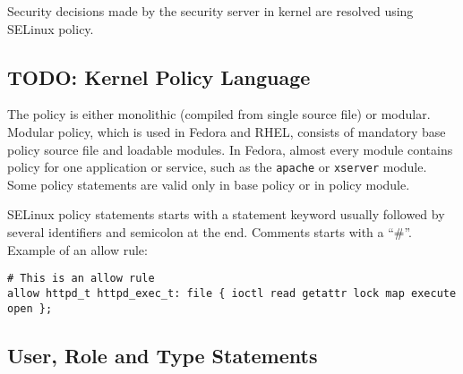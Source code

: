 Security decisions made by the security server in kernel are resolved using
SELinux policy.

\subsection{TODO: Kernel Policy Language}

The policy is either monolithic (compiled from single source file) or modular.
Modular policy, which is used in Fedora and RHEL, consists of mandatory base
policy source file and loadable modules. In Fedora, almost every module contains
policy for one application or service, such as the \texttt{apache} or
\texttt{xserver} module. Some policy statements are valid only in base policy or
in policy module.

SELinux policy statements starts with a statement keyword usually followed by
several identifiers and semicolon at the end. Comments starts with a ``\#''.
Example of an allow rule:

\begin{lstlisting}
# This is an allow rule
allow httpd_t httpd_exec_t: file { ioctl read getattr lock map execute open };
\end{lstlisting}

\subsection{User, Role and Type Statements}

